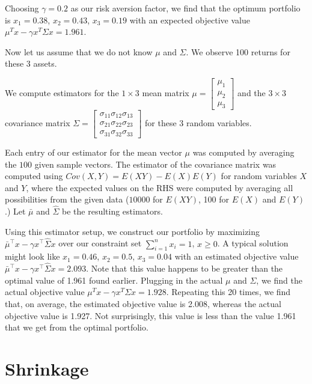 \documentclass{article}
\begin{document}
Choosing $\gamma = 0.2$ as our risk aversion factor, we find that the optimum portfolio is $x_1 = 0.38$, $x_2 = 0.43$, $x_3 = 0.19$
with an expected objective value
$\mu^T x - \gamma x^T \Sigma x = 1.961$.

Now let us assume that we do not know $\mu$ and $\Sigma$.  We observe 100 returns for these 3 assets.

We compute estimators for the $1 \times 3$ mean matrix $ \mu =  \begin{bmatrix} \mu_1 \\ \mu_2 \\ \mu_3  \end{bmatrix} $ and the $3 \times 3$ covariance matrix $ \Sigma = \begin{bmatrix} \sigma_{11} \sigma_{12} \sigma_{13}  \\ \sigma_{21} \sigma_{22} \sigma_{23} \\ \sigma_{31} \sigma_{32} \sigma_{33} \end{bmatrix} $ for these $3$ random variables.


Each entry of our estimator for the mean vector $\mu$ was computed by averaging the $100$ given sample vectors. The estimator of the covariance matrix was computed using $Cov(X,Y)=E(XY)-E(X)E(Y)$ for random variables $X$ and $Y$, where the expected values on the RHS were computed by averaging all possibilities from the given data ($10000$ for $E(XY)$, 100 for $E(X)$ and $E(Y)$.)  Let $\bar{\mu}$ and $\hat{\Sigma}$ be the resulting estimators.

Using this estimator setup, we construct our portfolio by maximizing $ \bar{\mu}^\top x - \gamma x^\top \hat{\Sigma} x $
over our constraint set $\sum_{i=1}^n x_i = 1$, $x \geq 0$.
A typical solution might look like $x_1 = 0.46$, $x_2 = 0.5$, $x_3 = 0.04$
with an estimated objective value $\bar{\mu}^\top x - \gamma x^\top \hat{\Sigma} x = 2.093$. 
Note that this value happens to be greater than the optimal value of 1.961 found earlier.
Plugging in the actual $\mu$ and $\Sigma$, we find the actual objective value  $\mu^T x - \gamma x^T \Sigma x = 1.928$.
Repeating this 20 times, we find that, on average, the estimated objective value is 2.008, whereas
the actual objective value is 1.927. Not surprisingly, this value is less than the value 1.961 that we get from the optimal portfolio.


\section{Shrinkage}
\end{document}
